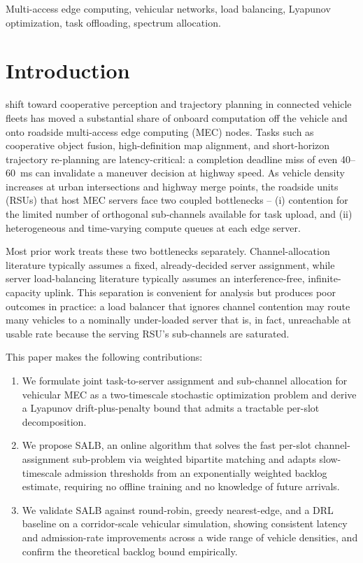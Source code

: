 \documentclass[journal,10pt]{IEEEtran}
\begin{document}
\begin{IEEEkeywords}
Multi-access edge computing, vehicular networks, load balancing, Lyapunov optimization, task offloading, spectrum allocation.
\end{IEEEkeywords}

\IEEEpeerreviewmaketitle

\section{Introduction}
 shift toward cooperative perception and trajectory planning in connected vehicle fleets has moved a substantial share of onboard computation off the vehicle and onto roadside multi-access edge computing (MEC) nodes. Tasks such as cooperative object fusion, high-definition map alignment, and short-horizon trajectory re-planning are latency-critical: a completion deadline miss of even 40--60~ms can invalidate a maneuver decision at highway speed. As vehicle density increases at urban intersections and highway merge points, the roadside units (RSUs) that host MEC servers face two coupled bottlenecks -- (i) contention for the limited number of orthogonal sub-channels available for task upload, and (ii) heterogeneous and time-varying compute queues at each edge server.

Most prior work treats these two bottlenecks separately. Channel-allocation literature typically assumes a fixed, already-decided server assignment, while server load-balancing literature typically assumes an interference-free, infinite-capacity uplink. This separation is convenient for analysis but produces poor outcomes in practice: a load balancer that ignores channel contention may route many vehicles to a nominally under-loaded server that is, in fact, unreachable at usable rate because the serving RSU's sub-channels are saturated.

This paper makes the following contributions:
\begin{enumerate}
\item We formulate joint task-to-server assignment and sub-channel allocation for vehicular MEC as a two-timescale stochastic optimization problem and derive a Lyapunov drift-plus-penalty bound that admits a tractable per-slot decomposition.
\item We propose SALB, an online algorithm that solves the fast per-slot channel-assignment sub-problem via weighted bipartite matching and adapts slow-timescale admission thresholds from an exponentially weighted backlog estimate, requiring no offline training and no knowledge of future arrivals.
\item We validate SALB against round-robin, greedy nearest-edge, and a DRL baseline on a corridor-scale vehicular simulation, showing consistent latency and admission-rate improvements across a wide range of vehicle densities, and confirm the theoretical backlog bound empirically.
\end{enumerate}
\end{document}
